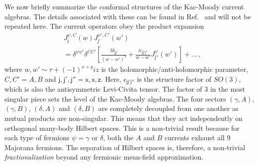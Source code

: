 We now briefly summarize the conformal structures of the Kac-Moody current algebras. The details associated with these can be found in Ref.~\cite{PhysRevB.94.165142} and will not be repeated here. The current operators obey the product expansion \begin{align}&J^{\psi,C}_{\mathsf{j}}(w)J^{\psi',C'}_{\mathsf{j}'}(w')\\&=\delta^{\psi\psi'}\delta^{CC'}\left[\frac{3\delta_{\mathsf{jj}'}}{(w-w')^2}+\frac{i\epsilon_{\mathsf{jj}'\mathsf{j}''}}{w-w'}J^\psi_{\mathsf{j}''}(w')\right]+\ldots\nonumber \,, \end{align} where $w,w'\sim \tau+(-1)^{x+y}iz$ is the holomorphic/anti-holomorphic parameter, $C,C'=A,B$ and $\mathsf{j},\mathsf{j}',\mathsf{j}''=\mathsf{x},\mathsf{x},\mathsf{z}$. Here, $\epsilon_{\mathsf{jj}'\mathsf{j}''}$ is the structure factor of $SO(3)$, which is also the antisymmetric Levi-Civita tensor. The factor of 3 in the most singular piece sets the level of the Kac-Moody algebras. The four sectors $(\gamma,A)$, $(\gamma,B)$, $(\delta,A)$ and $(\delta,B)$ are completely decoupled from one another as mutual products are non-singular. This means that they act independently on orthogonal many-body Hilbert spaces. This is a non-trivial result because for each type of fermions $\psi=\gamma$ or $\delta$, both the $A$ and $B$ currents exhaust all 9 Majorana fermions. The separation of Hilbert spaces is, therefore, a non-trivial {\em fractionalization} beyond any fermionic mean-field approximation.

